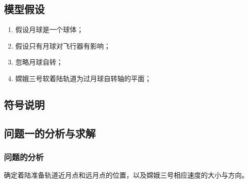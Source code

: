     \subsection{模型假设}
        \begin{enumerate}
        \item 假设月球是一个球体；
        \item 假设只有月球对飞行器有影响；
        \item 忽略月球自转；
        \item 嫦娥三号软着陆轨道为过月球自转轴的平面；
        \end{enumerate}
    \subsection{符号说明}
    \subsection{问题一的分析与求解}
        \subsubsection{问题的分析}
            \par
            确定着陆准备轨道近月点和远月点的位置，以及嫦娥三号相应速度的大小与方向。
